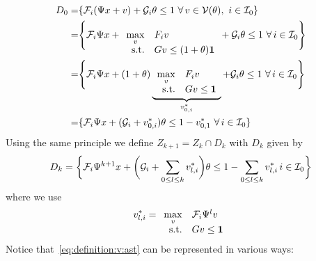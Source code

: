 \documentclass[letterpaper, 10pt, conference]{ieeeconf} %
\begin{document}
\begin{equation}\small
\begin{split}
	D_0 =& \{\mathcal F_i(\Psi x+v) + \mathcal G_i\theta \leq 1 \ \forall\, v\in\mathcal V(\theta), \ i\in\mathcal I_0\}\\
	=&\Biggl\{\mathcal F_i\Psi x + \begin{array}[t]{rl}\displaystyle\max_v& F_i v \\ \text{s.t.}& Gv \leq 
	(1+\theta){\bf{1}} \end{array}
	 + \mathcal G_i \theta \leq 1 \ \forall\, i\in\mathcal I_0\Biggr\}\\
	=&\Biggl\{\mathcal F_i\Psi x + (1+\theta)\underbrace{\begin{array}[t]{rl}\displaystyle\max_v& F_i v \\ 
	\text{s.t.}& Gv \leq {\bf{1}}\end{array}}_{v_{0,i}^\ast}
	 + \mathcal G_i \theta \leq 1 \ \forall\, i\in\mathcal I_0\Biggr\}\\
	=&\{\mathcal F_i\Psi x + (\mathcal G_i + v_{0,i}^\ast)\theta \leq 1 - v_{0,1}^\ast \ \forall \, i\in\mathcal I_0
	\}
\end{split}\end{equation}
%
Using the same principle we define $Z_{k+1}=Z_k\cap D_k$ with $D_k$ given by
%
\begin{equation}\label{eq:parametrised:Dk}\small
	D_k = \biggl\{\mathcal F_i\Psi^{k+1}x+ \biggl(\mathcal G_i +\sum_{0\leq l\leq k} v_{l,i}^\ast\biggr)\theta \leq 1 
	- \sum_{0\leq l\leq k} v_{l,i}^\ast\, i\in\mathcal I_0\biggr\}
\end{equation}
%
where we use 
%
\begin{equation}\label{eq:definition:v:ast}
v_{l,i}^\ast = \begin{array}[t]{rl}\displaystyle\max_v & \mathcal F_i \Psi^{l} v \\ \text{s.t.}& Gv\leq{\bf{1}}
\end{array}
\end{equation}
%
Notice that~\eqref{eq:definition:v:ast} can be represented in various ways:
%
\end{document}
